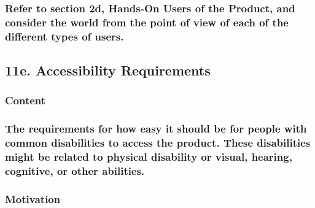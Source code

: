 \documentclass[
]{article}
\begin{document}
\hypertarget{refer-to-section-2d-hands-on-users-of-the-product-and-consider-the-world-from-the-point-of-view-of-each-of-the-different-types-of-users.}{%
\subsubsection{\texorpdfstring{Refer to section 2d, Hands-On Users of
the Product, and consider the world from the point of view of each of
the different types of users.
}{Refer to section 2d, Hands-On Users of the Product, and consider the world from the point of view of each of the different types of users. }}\label{refer-to-section-2d-hands-on-users-of-the-product-and-consider-the-world-from-the-point-of-view-of-each-of-the-different-types-of-users.}}

\hypertarget{e.-accessibility-requirements}{%
\subsection{11e. Accessibility
Requirements}\label{e.-accessibility-requirements}}

\hypertarget{content-36}{%
\subsubsection{Content}\label{content-36}}

\hypertarget{the-requirements-for-how-easy-it-should-be-for-people-with-common-disabilities-to-access-the-product.-these-disabilities-might-be-related-to-physical-disability-or-visual-hearing-cognitive-or-other-abilities.}{%
\subsubsection{\texorpdfstring{The requirements for how easy it should
be for people with common disabilities to access the product. These
disabilities might be related to physical disability or visual, hearing,
cognitive, or other abilities.
}{The requirements for how easy it should be for people with common disabilities to access the product. These disabilities might be related to physical disability or visual, hearing, cognitive, or other abilities. }}\label{the-requirements-for-how-easy-it-should-be-for-people-with-common-disabilities-to-access-the-product.-these-disabilities-might-be-related-to-physical-disability-or-visual-hearing-cognitive-or-other-abilities.}}

\hypertarget{motivation-35}{%
\subsubsection{Motivation}\label{motivation-35}}
\end{document}
